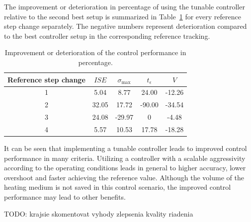 \documentclass[preprint,12pt]{elsarticle}
\begin{document}
The improvement or deterioration in percentage of using the tunable controller relative to the second best setup is summarized in Table~\ref{tab:improvement} for every reference step change separately. The negative numbers represent deterioration compared to the best controller setup in the corresponding reference tracking. 

\begin{table}[h!]
	\begin{center}
		\caption{Improvement or deterioration of the control performance in percentage.}
		\label{tab:improvement}
		\begin{tabular}{c|c|c|c|c} 
			Reference step change & $ISE$ & $\sigma_{\mathrm{max}}$ & $t_{\epsilon}$ & $V$ \\
			\hline
			1 & 5.04 & 8.77 & 24.00 & -12.26 \\ 
			\hline
			2 & 32.05 & 17.72 & -90.00 & -34.54 \\ 
			\hline
			3 & 24.08 & -29.97 & 0 & -4.48 \\ 
			\hline
			4 & 5.57 & 10.53 & 17.78 & -18.28  
		\end{tabular}
	\end{center}
\end{table}

It can be seen that implementing a tunable controller leads to improved control performance in many criteria. Utilizing a controller with a scalable aggressivity according to the operating conditions leads in general to higher accuracy, lower overshoot and faster achieving the reference value. %
Although the volume of the heating medium is not saved in this control scenario, the improved control performance may lead to other benefits. 

TODO: krajsie skomentovat vyhody zlepsenia kvality riadenia
\end{document}
